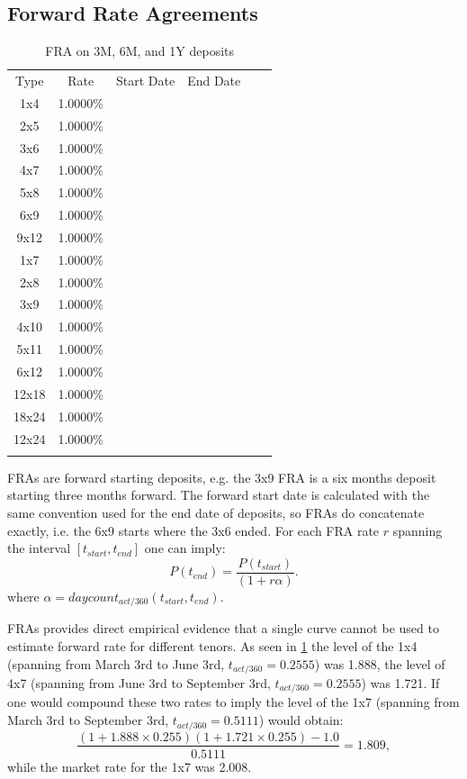 \documentclass[11pt,reqno]{amsart}
\begin{document}
\subsection{\label{SecFRA}Forward Rate Agreements}
\begin{table}[tbp]
\label{tab:fra}
\begin{tabular}{cccccc}
Type & Rate & Start Date & End Date &  &  \\
1x4 & 1.0000\% &  &  &  &  \\
2x5 & 1.0000\% &  &  &  &  \\
3x6 & 1.0000\% &  &  &  &  \\
4x7 & 1.0000\% &  &  &  &  \\
5x8 & 1.0000\% &  &  &  &  \\
6x9 & 1.0000\% &  &  &  &  \\
9x12 & 1.0000\% &  &  &  &  \\
1x7 & 1.0000\% &  &  &  &  \\
2x8 & 1.0000\% &  &  &  &  \\
3x9 & 1.0000\% &  &  &  &  \\
4x10 & 1.0000\% &  &  &  &  \\
5x11 & 1.0000\% &  &  &  &  \\
6x12 & 1.0000\% &  &  &  &  \\
12x18 & 1.0000\% &  &  &  &  \\
18x24 & 1.0000\% &  &  &  &  \\
12x24 & 1.0000\% &  &  &  &  \\
&  &  &  &  &
\end{tabular}%
\caption{FRA on 3M, 6M, and 1Y deposits}
\end{table}

FRAs are forward starting deposits, e.g. the 3x9 FRA is a six months deposit starting three months forward. The forward start date is calculated with the same convention used for the end date of deposits, so FRAs do concatenate exactly, i.e. the 6x9 starts where the 3x6 ended. For each FRA rate $r$ spanning the interval $[t_{start}, t_{end}]$ one can imply:
\begin{equation}
P(t_{end}) = \frac{P(t_{start})}{(1 + r \alpha)}.
\label{eqn:deposit}
\end{equation}
where $\alpha = daycount_{act/360}(t_{start}, t_{end})$.

FRAs provides direct empirical evidence that a single curve cannot be used to estimate forward rate for different tenors. As seen in \ref{tab:fra} the level of the 1x4 (spanning from March 3rd to June 3rd, $t_{act/360} = 0.2555$) was 1.888, the level of 4x7 (spanning from June 3rd to September 3rd, $t_{act/360} = 0.2555$) was 1.721. If one would compound these two rates to imply the level of the 1x7 (spanning from March 3rd to September 3rd, $t_{act/360} = 0.5111$) would obtain:
\begin{equation}
\frac{
    \left( 1 + 1.888 \times 0.255\right)
    \left( 1 + 1.721 \times 0.255\right)
    - 1.0}{0.5111 }=1.809,
\label{eqn:FRAarbitrage}
\end{equation}
while the market rate for the 1x7 was 2.008.
\end{document}
